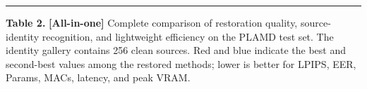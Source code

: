 \documentclass[10pt]{article}
\begin{document}
\providecommand{\PTbest}[1]{\color{PTbest}\bfseries #1}
\providecommand{\PTsecond}[1]{\color{PTsecond}#1}
\newcommand{\NA}{--}

\begingroup
\scriptsize
\setlength{\tabcolsep}{1.4pt}
\hrule
\vspace{2pt}
\noindent\raggedright
\textbf{Table 2.} \textbf{[All-in-one]} Complete comparison of restoration quality, source-identity recognition, and lightweight efficiency on the PLAMD test set.
The identity gallery contains 256 clean sources. Red and blue indicate the best and second-best values among the restored methods; lower is better for LPIPS, EER, Params, MACs, latency, and peak VRAM.
\par\vspace{3pt}
\noindent\centering
\end{document}
